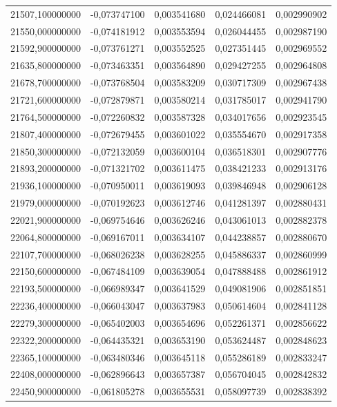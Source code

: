 \begin{longtable}{rrrrr}
21507,100000000 & -0,073747100 & 0,003541680 & 0,024466081 & 0,002990902\\
21550,000000000 & -0,074181912 & 0,003553594 & 0,026044455 & 0,002987190\\
21592,900000000 & -0,073761271 & 0,003552525 & 0,027351445 & 0,002969552\\
21635,800000000 & -0,073463351 & 0,003564890 & 0,029427255 & 0,002964808\\
21678,700000000 & -0,073768504 & 0,003583209 & 0,030717309 & 0,002967438\\
21721,600000000 & -0,072879871 & 0,003580214 & 0,031785017 & 0,002941790\\
21764,500000000 & -0,072260832 & 0,003587328 & 0,034017656 & 0,002923545\\
21807,400000000 & -0,072679455 & 0,003601022 & 0,035554670 & 0,002917358\\
21850,300000000 & -0,072132059 & 0,003600104 & 0,036518301 & 0,002907776\\
21893,200000000 & -0,071321702 & 0,003611475 & 0,038421233 & 0,002913176\\
21936,100000000 & -0,070950011 & 0,003619093 & 0,039846948 & 0,002906128\\
21979,000000000 & -0,070192623 & 0,003612746 & 0,041281397 & 0,002880431\\
22021,900000000 & -0,069754646 & 0,003626246 & 0,043061013 & 0,002882378\\
22064,800000000 & -0,069167011 & 0,003634107 & 0,044238857 & 0,002880670\\
22107,700000000 & -0,068026238 & 0,003628255 & 0,045886337 & 0,002860999\\
22150,600000000 & -0,067484109 & 0,003639054 & 0,047888488 & 0,002861912\\
22193,500000000 & -0,066989347 & 0,003641529 & 0,049081906 & 0,002851851\\
22236,400000000 & -0,066043047 & 0,003637983 & 0,050614604 & 0,002841128\\
22279,300000000 & -0,065402003 & 0,003654696 & 0,052261371 & 0,002856622\\
22322,200000000 & -0,064435321 & 0,003653190 & 0,053624487 & 0,002848623\\
22365,100000000 & -0,063480346 & 0,003645118 & 0,055286189 & 0,002833247\\
22408,000000000 & -0,062896643 & 0,003657387 & 0,056704045 & 0,002842832\\
22450,900000000 & -0,061805278 & 0,003655531 & 0,058097739 & 0,002838392\\

\end{longtable}
